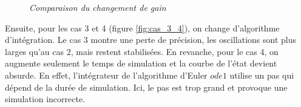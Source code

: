 \documentclass[11pt,french]{article} %
\begin{document}
\begin{figure}[H]%
    \centering
		\noindent{}%
		\caption{\textit{Comparaison du changement de gain}}%
		\label{fig:cas_1_2}%
\end{figure}
\vspace{0.5cm}

Ensuite, pour les cas 3 et 4 (figure \ref{fig:cas_3_4}), on change d'algorithme d'intégration. Le cas 3 montre une perte de précision, les oscillations sont plus larges qu'au cas 2, mais restent stabilisées. En revanche, pour le cas 4, on augmente seulement le temps de simulation et la courbe de l'état devient absurde. En effet, l'intégrateur de l'algorithme d'Euler $ode1$ utilise un pas qui dépend de la durée de simulation. Ici, le pas est trop grand et provoque une simulation incorrecte. \\
\end{document}
